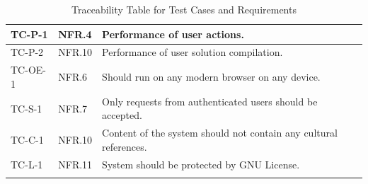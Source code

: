 \documentclass[12pt, titlepage]{article}
\begin{document}
\begin{longtable}{| p{2.5cm} | p{3cm} | p{8cm}| }
    \hline
     TC-P-1 & NFR.4 & Performance of user actions.\\
    \hline
    TC-P-2 & NFR.10 & Performance of user solution compilation.\\
     \hline
    TC-OE-1 & NFR.6 & Should run on any modern browser on any device. \\
     \hline
    TC-S-1 & NFR.7 & Only requests from authenticated users should be accepted. \\
     \hline
    TC-C-1 & NFR.10 & Content of the system should not contain any cultural references.\\
     \hline
    TC-L-1 & NFR.11 & System should be protected by GNU License.\\
     \hline
    \caption{Traceability Table for Test Cases and Requirements}
    \label{tab:trace}
\end{longtable}
\end{document}
